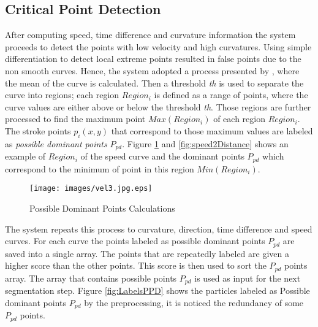 \subsection{Critical Point Detection}
\label{sec:CriticalPointDetection}
After computing speed, time difference and curvature information the system proceeds to detect the points with low velocity and high curvatures. Using simple differentiation to detect local extreme points resulted in false points due to the non smooth curves. Hence, the system adopted a process presented by \cite{earlyprocess}, where the mean of the curve is calculated. Then a threshold \textit{th} is used to separate the curve into regions; each region $Region_i$ is defined as a range of points, where the curve values are either above or below the threshold \textit{th}. Those regions are further processed to find the maximum point $Max(Region_i)$ of each region $Region_i$. The stroke points $p_i(x,y)$ that correspond to those maximum values are labeled as \textit{possible dominant points} $P_{pd}$. Figure \ref{fig:MaxRegioi} and \ref{fig:speed2Distance} shows an example of $Region_i$ of the speed curve and the dominant points $P_{pd}$ which correspond to the minimum of point in this region $Min(Region_i)$.  %
\begin{figure}
	\centering
		\texttt{[image: images/vel3.jpg.eps]}
	\caption{Possible Dominant Points Calculations}
	\label{fig:MaxRegioi}
\end{figure}

  
The system repeats this process to curvature, direction, time difference and speed curves. For each curve the points labeled as possible dominant points $P_{pd}$ are saved into a single array. The points that are repeatedly labeled are given a higher score than the other points. This score is then used to sort the  $P_{pd}$ points array. The array that contains possible points $P_{pd}$ is used as input for the next segmentation step. Figure \ref{fig:LabelsPPD} shows the particles labeled as Possible dominant points $P_{pd}$ by the preprocessing, it is noticed the redundancy of some $P_{pd}$ points. 


